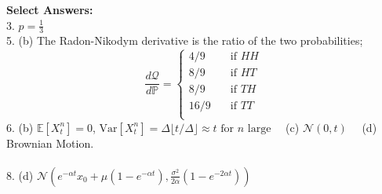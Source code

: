 \documentclass[11pt]{article}
\newcommand{\PR}{\mathbb{P}}
\begin{document}
	\textbf{Select Answers:}\\
	3. \( p=\frac{1}{3} \) \\[1em]
	5. (b) The Radon-Nikodym derivative is the ratio of the two probabilities;
	\[	\frac{d\mathcal{Q}}{d\PR} = \begin{cases}
		4/9 & \quad \text{if }HH\\
		8/9 & \quad \text{if }HT\\
		8/9 & \quad \text{if }TH\\
		16/9 & \quad \text{if }TT\\
	\end{cases}
	\] 
	6. (b) $\mathbb{E}[X^{n}_{t}] = 0$, $\text{Var}[X^{n}_{t}] = \Delta \lfloor t/ \Delta\rfloor\approx t \text{ for $n$ large}\quad$ (c) $\mathcal{N}(0,t)\quad$ (d) Brownian Motion.\\\\
	8. (d) $\mathcal{N}\left(e^{-\alpha t}x_{0} + \mu(1 - e^{-\alpha t}), \frac{\sigma^{2}}{2\alpha}(1 - e^{-2\alpha t})\right)$
\end{document}
